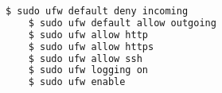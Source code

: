 \begin{lstlisting}[language=bash,catption=Konfiguration der UFW mit ad-hoc Kommandos,label={lst:ad-hoc-config}]
    $ sudo ufw default deny incoming
    $ sudo ufw default allow outgoing
    $ sudo ufw allow http
    $ sudo ufw allow https
    $ sudo ufw allow ssh
    $ sudo ufw logging on
    $ sudo ufw enable
\end{lstlisting}